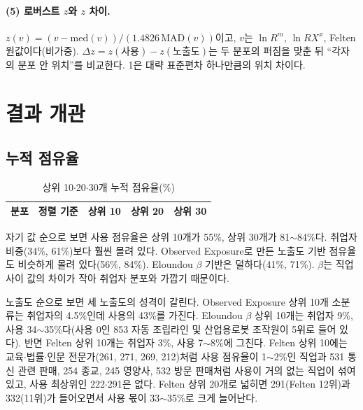 \documentclass[11pt]{article}
\begin{document}
\paragraph{(5) 로버스트 $z$와 $z$ 차이.} $z(v) = (v - \mathrm{med}(v)) / (1.4826\,\mathrm{MAD}(v))$이고, $v$는 $\ln R^m$, $\ln RX^x$, Felten 원값이다(비가중). $\Delta z = z(\text{사용}) - z(\text{노출도})$는 두 분포의 퍼짐을 맞춘 뒤 ``각자의 분포 안 위치''를 비교한다. 1은 대략 표준편차 하나만큼의 위치 차이다.

\section{결과 개관}

\subsection{누적 점유율}

\begin{small}
\begin{longtable}{L{6.2cm}L{3.6cm}R{1.8cm}R{1.8cm}R{1.8cm}}
\caption{상위 10$\cdot$20$\cdot$30개 누적 점유율(\%)}\label{tab:topshare}\\
\toprule
분포 & 정렬 기준 & 상위 10 & 상위 20 & 상위 30 \\
\midrule
\endfirsthead

\bottomrule
\end{longtable}
\end{small}

자기 값 순으로 보면 사용 점유율은 상위 10개가 55\%, 상위 30개가 81$\sim$84\%다. 취업자 비중(34\%, 61\%)보다 훨씬 몰려 있다. Observed Exposure로 만든 노출도 기반 점유율도 비슷하게 몰려 있다(56\%, 84\%). Eloundou $\beta$ 기반은 덜하다(41\%, 71\%). $\beta$는 직업 사이 값의 차이가 작아 취업자 분포와 가깝기 때문이다.

노출도 순으로 보면 세 노출도의 성격이 갈린다. Observed Exposure 상위 10개 소분류는 취업자의 4.5\%인데 사용의 43\%를 가진다. Eloundou $\beta$ 상위 10개는 취업자 9\%, 사용 34$\sim$35\%다(사용 0인 853 자동 조립라인 및 산업용로봇 조작원이 5위로 들어 있다). 반면 Felten 상위 10개는 취업자 3\%, 사용 7$\sim$8\%에 그친다. Felten 상위 10에는 교육$\cdot$법률$\cdot$인문 전문가(261, 271, 269, 212)처럼 사용 점유율이 1$\sim$2\%인 직업과 531 통신 관련 판매, 254 종교, 245 영양사, 532 방문 판매처럼 사용이 거의 없는 직업이 섞여 있고, 사용 최상위인 222$\cdot$291은 없다. Felten 상위 20개로 넓히면 291(Felten 12위)과 332(11위)가 들어오면서 사용 몫이 33$\sim$35\%로 크게 늘어난다.
\end{document}
